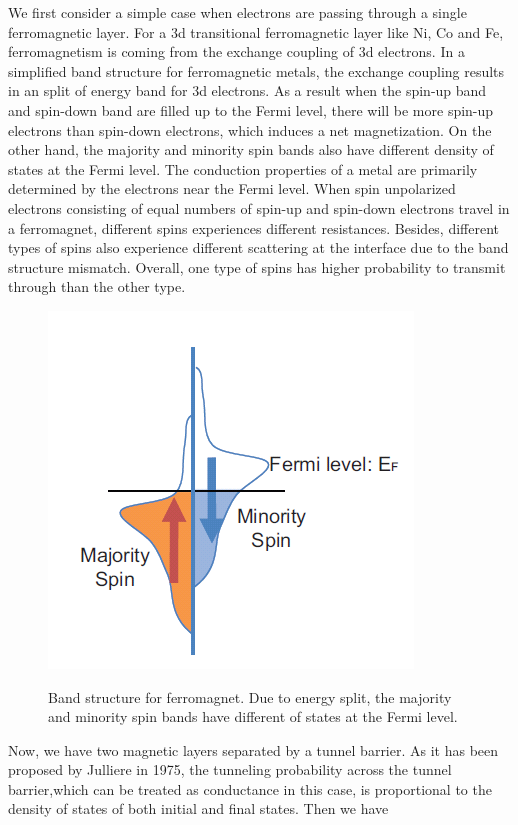 We first consider a simple case when electrons are passing through a single ferromagnetic layer. For a 3d transitional ferromagnetic layer like Ni, Co and Fe, ferromagnetism is coming from the exchange coupling of 3d electrons. In a simplified band structure for ferromagnetic metals, the exchange coupling results in an split of energy band for 3d electrons. As a result when the spin-up band and spin-down band are filled up to the Fermi level, there will be more spin-up electrons than spin-down electrons, which induces a net magnetization. On the other hand, the majority and minority spin bands also have different density of states at the Fermi level. The conduction properties of a metal are primarily determined by the electrons near the Fermi level. When spin unpolarized electrons consisting of equal numbers of spin-up and spin-down electrons travel in a ferromagnet, different spins experiences different resistances. Besides, different types of spins also experience different scattering at the interface due to the band structure mismatch. Overall, one type of spins has higher probability to transmit through than the other type.

\begin{figure}[!ht]
\centering
\includegraphics{fig/Fermi.PNG}
\label{Fermi}
\caption{Band structure for ferromagnet. Due to energy split, the majority and minority spin bands have different of states at the Fermi level.}

\end{figure}




Now, we have two magnetic layers separated by a tunnel barrier. As it has been proposed by Julliere in 1975, the tunneling probability across the tunnel barrier,which can be treated as conductance in this case, is proportional to the density of states of both initial and final states. Then we have 




